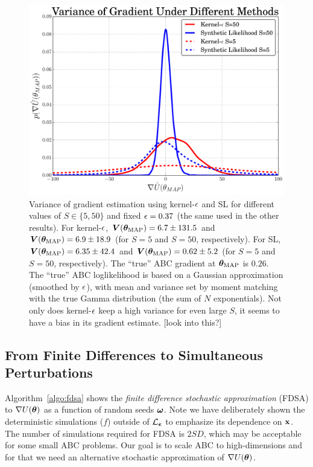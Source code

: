 \documentclass[]{article}
\begin{document}
\begin{figure}[t]
\vskip 0.2in
\begin{center}
\includegraphics[width=0.95\columnwidth]{./images/exp_varg_figure.pdf}
\caption{\small{Variance of gradient estimation using kernel-$\epsilon$ and SL for different values of $S\in\{5,50\}$ and fixed $\epsilon = 0.37$ (the same used in the other results).  For kernel-$\epsilon$, ${\bm V}({\bm \theta}_{\text{MAP}}) = 6.7 \pm 131.5$ and ${\bm V}({\bm \theta}_{\text{MAP}}) = 6.9 \pm 18.9$ (for $S=5$ and $S=50$, respectively).  For SL,${\bm V}({\bm \theta}_{\text{MAP}}) = 6.35 \pm 42.4$ and ${\bm V}({\bm \theta}_{\text{MAP}}) = 0.62 \pm 5.2$ (for $S=5$ and $S=50$, respectively).  The ``true'' ABC gradient at ${\bm \theta}_{\text{MAP}}$ is $0.26$.  The ``true'' ABC loglikelihood is based on a Gaussian approximation (smoothed by $\epsilon$), with mean and variance set by moment matching with the true Gamma distribution (the sum of $N$ exponentials). Not only does kernel-$\epsilon$ keep a high variance for even large $S$, it seems to have a bias in its gradient estimate.  [look into this?] }}
\label{fig:exp-varg}
\end{center}
\vskip -0.2in
\end{figure}

\subsection{From Finite Differences to Simultaneous Perturbations}

Algorithm~\ref{algo:fdsa} shows the {\em finite difference stochastic approximation} (FDSA) \cite{kiefer1952stochastic} to $\nabla U({\bm \theta})$ as a function of random seeds ${\bm \omega}$.  Note we have deliberately shown the deterministic simulations ($f$) outside of $\mathcal{L}_{{\bm {\epsilon}}}$ to emphasize its dependence on ${\bf x}$.  The number of simulations required for FDSA is $2 S D$, which may be acceptable for some small ABC problems.  Our goal is to scale ABC to high-dimensions and for that we need an alternative stochastic approximation of $\nabla U({\bm \theta})$.
\end{document}
